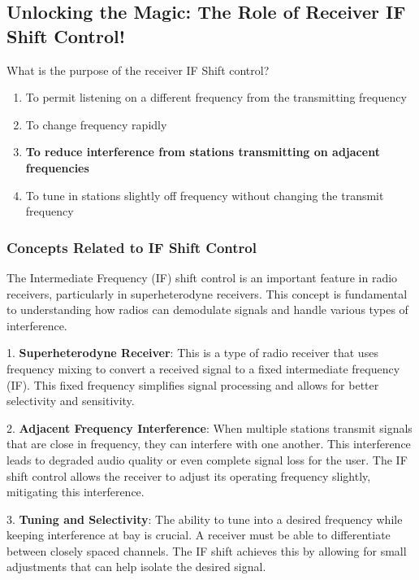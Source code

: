 \subsection{Unlocking the Magic: The Role of Receiver IF Shift Control!}

\begin{tcolorbox}[colback=gray!10, colframe=black, title=E4C14] What is the purpose of the receiver IF Shift control? 
\begin{enumerate}[label=\Alph*.]
    \item To permit listening on a different frequency from the transmitting frequency
    \item To change frequency rapidly
    \item \textbf{To reduce interference from stations transmitting on adjacent frequencies}
    \item To tune in stations slightly off frequency without changing the transmit frequency
\end{enumerate} \end{tcolorbox}

\subsubsection{Concepts Related to IF Shift Control}

The Intermediate Frequency (IF) shift control is an important feature in radio receivers, particularly in superheterodyne receivers. This concept is fundamental to understanding how radios can demodulate signals and handle various types of interference.

1. \textbf{Superheterodyne Receiver}: This is a type of radio receiver that uses frequency mixing to convert a received signal to a fixed intermediate frequency (IF). This fixed frequency simplifies signal processing and allows for better selectivity and sensitivity.

2. \textbf{Adjacent Frequency Interference}: When multiple stations transmit signals that are close in frequency, they can interfere with one another. This interference leads to degraded audio quality or even complete signal loss for the user. The IF shift control allows the receiver to adjust its operating frequency slightly, mitigating this interference.

3. \textbf{Tuning and Selectivity}: The ability to tune into a desired frequency while keeping interference at bay is crucial. A receiver must be able to differentiate between closely spaced channels. The IF shift achieves this by allowing for small adjustments that can help isolate the desired signal.

